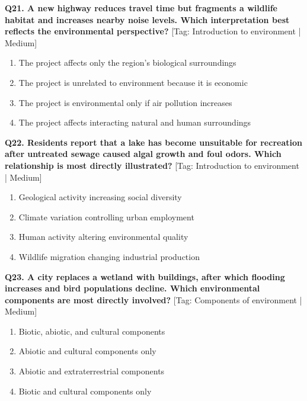 \noindent\textbf{Q21. A new highway reduces travel time but fragments a wildlife habitat and increases nearby noise levels. Which interpretation best reflects the environmental perspective?} \hfill [Tag: Introduction to environment | Medium]
\begin{enumerate}[label=(\alph*),topsep=2pt,itemsep=1pt,partopsep=0pt,parsep=0pt]
    \item {The project affects only the region's biological surroundings}
    \item {The project is unrelated to environment because it is economic}
    \item {The project is environmental only if air pollution increases}
    \item {The project affects interacting natural and human surroundings}
\end{enumerate}
\vspace{2mm}

\noindent\textbf{Q22. Residents report that a lake has become unsuitable for recreation after untreated sewage caused algal growth and foul odors. Which relationship is most directly illustrated?} \hfill [Tag: Introduction to environment | Medium]
\begin{enumerate}[label=(\alph*),topsep=2pt,itemsep=1pt,partopsep=0pt,parsep=0pt]
    \item {Geological activity increasing social diversity}
    \item {Climate variation controlling urban employment}
    \item {Human activity altering environmental quality}
    \item {Wildlife migration changing industrial production}
\end{enumerate}
\vspace{2mm}

\noindent\textbf{Q23. A city replaces a wetland with buildings, after which flooding increases and bird populations decline. Which environmental components are most directly involved?} \hfill [Tag: Components of environment | Medium]
\begin{enumerate}[label=(\alph*),topsep=2pt,itemsep=1pt,partopsep=0pt,parsep=0pt]
    \item {Biotic, abiotic, and cultural components}
    \item {Abiotic and cultural components only}
    \item {Abiotic and extraterrestrial components}
    \item {Biotic and cultural components only}
\end{enumerate}
\vspace{2mm}

